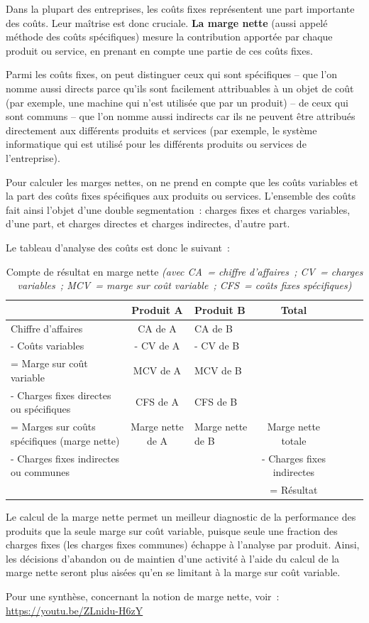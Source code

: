 \documentclass[oneside]{kaobook}
\begin{document}
Dans la plupart des entreprises, les coûts fixes représentent une part importante des coûts. Leur maîtrise est donc cruciale. \textbf{La marge nette} (aussi appelé méthode des coûts spécifiques) mesure la contribution apportée par chaque produit ou service, en prenant en compte une partie de ces coûts fixes.

Parmi les coûts fixes, on peut distinguer ceux qui sont spécifiques – que l'on nomme aussi directs parce qu'ils sont facilement attribuables à un objet de coût (par exemple, une machine qui n'est utilisée que par un produit) – de ceux qui sont communs – que l'on nomme aussi indirects car ils ne peuvent être attribués directement aux différents produits et services (par exemple, le système informatique qui est utilisé pour les différents produits ou services de l'entreprise).

Pour calculer les marges nettes, on ne prend en compte que les coûts variables et la part des coûts fixes spécifiques aux produits ou services. L'ensemble des coûts fait ainsi l'objet d'une double segmentation : charges fixes et charges variables, d'une part, et charges directes et charges indirectes, d'autre part.

Le tableau d'analyse des coûts est donc le suivant :

\begin{table}[htbp]
\caption{Compte de résultat en marge nette \emph{(avec CA = chiffre d'affaires ; CV = charges variables ; MCV = marge sur coût variable ; CFS = coûts fixes spécifiques)}}
\centering
\footnotesize
\begin{tabular}{p{3cm} cp{2cm} cp{2cm} cp{3cm}}
 & Produit A & Produit B & Total\\
\hline
Chiffre d'affaires & CA de A & CA de B & \\
- Coûts variables & - CV de A & - CV de B & \\
= Marge sur coût variable & MCV de A & MCV de B & \\
- Charges fixes directes ou spécifiques & CFS de A & CFS de B & \\
= Marges sur coûts spécifiques (marge nette) & Marge nette de A & Marge nette de B & Marge nette totale\\
- Charges fixes indirectes ou communes &  &  & - Charges fixes indirectes\\
 &  &  & = Résultat\\
\end{tabular}
\end{table}

\begin{kaobox}
Le calcul de la marge nette permet un meilleur diagnostic de la performance des produits que la seule marge sur coût variable, puisque seule une fraction des charges fixes (les charges fixes communes) échappe à l'analyse par produit. Ainsi, les décisions d'abandon ou de maintien d'une activité à l'aide du calcul de la marge nette seront plus aisées qu'en se limitant à la marge sur coût variable.

Pour une synthèse, concernant la notion de marge nette, voir : \url{https://youtu.be/ZLnidu-H6zY}
\end{kaobox}
\end{document}
